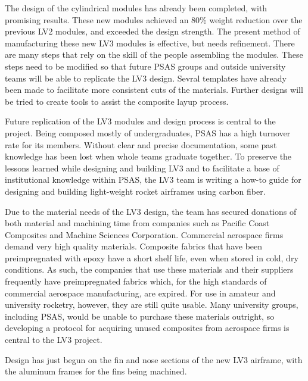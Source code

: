 \documentclass{aiaa-tc}%
\begin{document}
The design of the cylindrical modules has already been completed, with promising results. These new modules achieved an 80\% weight reduction over the previous LV2 modules, and exceeded the design strength. 
The present method of manufacturing these new LV3 modules is effective, but needs refinement. There are many steps that rely on the skill of the people assembling the modules. These steps need to be modified so that future PSAS groups and outside university teams will be able to replicate the LV3 design.
Sevral templates have already been made to facilitate more consistent cuts of the materials. Further designs will be tried to create tools to assist the composite layup process. 

Future replication of the LV3 modules and design process is central to the project. Being composed mostly of undergraduates, PSAS has a high turnover rate for its members. Without clear and precise documentation, some past knowledge has been lost when whole teams graduate together. 
To preserve the lessons learned while designing and building LV3 and to facilitate a base of institutional knowledge within PSAS, the LV3 team is writing a how-to guide for designing and building light-weight rocket airframes using carbon fiber.

Due to the material needs of the LV3 design, the team has secured donations of both material and machining time from companies such as Pacific Coast Composites and Machine Sciences Corporation. 
Commercial aerospace firms demand very high quality materials. Composite fabrics that have been preimpregnated with epoxy have a short shelf life, even when stored in cold, dry conditions. As such, the companies that use these materials and their suppliers frequently have  preimpregnated fabrics which, for the high standards of commercial aerospace manufacturing, are expired. 
For use in amateur and university rocketry, however, they are still quite usable. Many university groups, including PSAS, would be unable to purchase these materials outright, so developing a protocol for acquiring unused composites from aerospace firms is central to the LV3 project. 

Design has just begun on the fin and nose sections of the new LV3 airframe, with the aluminum frames for the fins being machined. 
\end{document}

